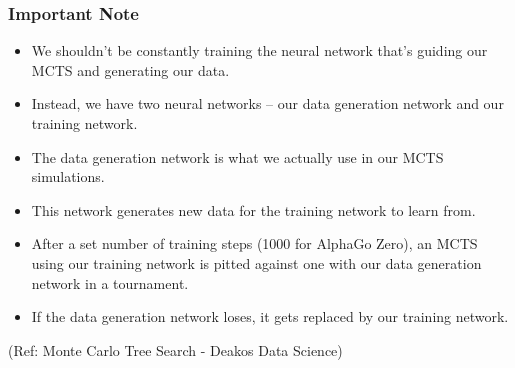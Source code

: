 \begin{frame}[fragile]\frametitle{Important Note}

\begin{itemize}
\item We shouldn’t be constantly training the neural network that’s guiding our MCTS and generating our data. 
\item Instead, we have two neural networks – our data generation network and our training network. 
\item The data generation network is what we actually use in our MCTS simulations. 
\item This network generates new data for the training network to learn from. 
\item After a set number of training steps (1000 for AlphaGo Zero), an MCTS using our training network is pitted against one with our data generation network in a tournament. 
\item If the data generation network loses, it gets replaced by our training network.
\end{itemize}


{\tiny (Ref: Monte Carlo Tree Search - Deakos Data Science)}

\end{frame}





